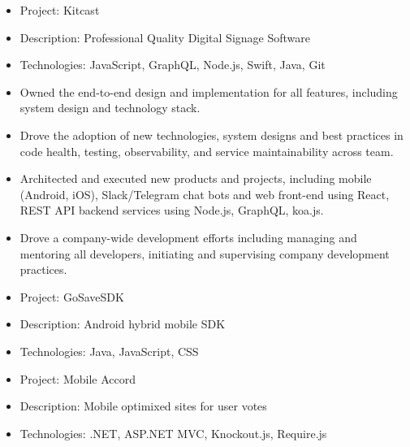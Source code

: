 \documentclass{resume}
\begin{document}

\begin{itemize}
  \item Project: Kitcast
  \item Description: Professional Quality Digital Signage Software
  \item Technologies: JavaScript, GraphQL, Node.js, Swift, Java, Git
  \item Owned the end-to-end design and implementation for all features, including system design and technology stack.
  \item Drove the adoption of new technologies, system designs and best practices in code health, testing, observability, and service maintainability across team.
\end{itemize}


\begin{itemize}
  \item Architected and executed new products and projects, including mobile (Android, iOS), Slack/Telegram chat bots and web front-end using React, REST API backend services using Node.js, GraphQL, koa.js.
  \item Drove a company-wide development efforts including managing and mentoring all developers, initiating and supervising company development practices.
\end{itemize}


\begin{itemize}
  \item Project: GoSaveSDK
  \item Description: Android hybrid mobile SDK
  \item Technologies: Java, JavaScript, CSS
\end{itemize}



\begin{itemize}
  \item Project: Mobile Accord 
  \item Description: Mobile optimixed sites for user votes
  \item Technologies: .NET, ASP.NET MVC, Knockout.js, Require.js
\end{itemize}
\end{document}
